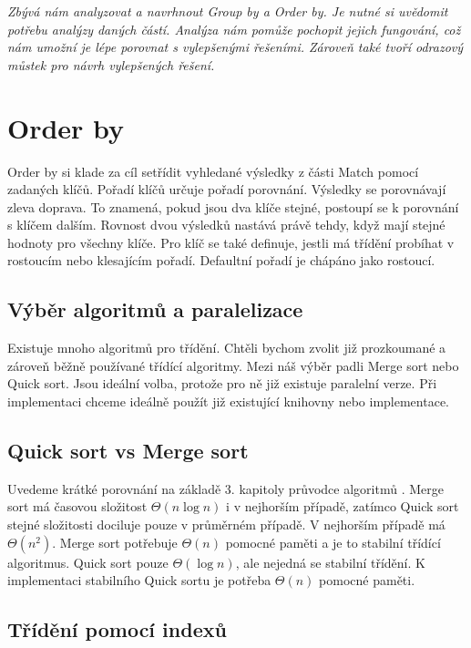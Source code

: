 \bigskip
\textit{Zbývá nám analyzovat a navrhnout Group by a Order by.
Je nutné si uvědomit potřebu analýzy daných částí.
Analýza nám pomůže pochopit jejich fungování, což nám umožní je lépe porovnat s vylepšenými řešeními. 
Zároveň také tvoří odrazový můstek pro návrh vylepšených řešení.}

\section{Order by}

Order by si klade za cíl setřídit vyhledané výsledky z části Match pomocí zadaných klíčů.
Pořadí klíčů určuje pořadí porovnání.
Výsledky se porovnávají zleva doprava.
To znamená, pokud jsou dva klíče stejné, postoupí se k porovnání s klíčem dalším.
Rovnost dvou výsledků nastává právě tehdy, když mají stejné hodnoty pro všechny klíče. 
Pro klíč se také definuje, jestli má třídění probíhat v rostoucím nebo klesajícím pořadí.
Defaultní pořadí je chápáno jako rostoucí. 

\subsection{Výběr algoritmů a paralelizace}

Existuje mnoho algoritmů pro třídění.
Chtěli bychom zvolit již prozkoumané a zároveň běžně používané třídící algoritmy.
Mezi náš výběr padli Merge sort nebo Quick sort.
Jsou ideální volba, protože pro ně již existuje paralelní verze.
Při implementaci chceme ideálně použít již existující knihovny nebo implementace. 

\subsection{Quick sort vs Merge sort}

Uvedeme krátké porovnání na základě 3. kapitoly průvodce algoritmů \citep{labyrint}. 
Merge sort má časovou složitost $ \Theta(n\log n) $ i v nejhorším případě, zatímco Quick sort stejné složitosti dociluje pouze v průměrném případě.
V nejhorším případě má $\Theta(n^2)$.
Merge sort potřebuje $\Theta(n)$ pomocné paměti a je to stabilní třídící algoritmus.
Quick sort pouze $\Theta(\log n)$, ale nejedná se stabilní třídění.
K implementaci stabilního Quick sortu je potřeba $\Theta(n)$ pomocné paměti.

\subsection{Třídění pomocí indexů}

